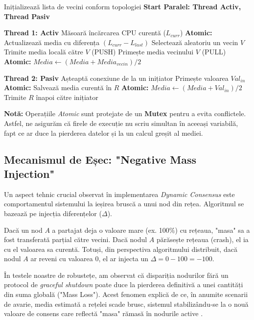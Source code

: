 \begin{algorithm}[H]
    \caption{Push-Pull Dynamic Average Consensus}
    \label{alg:push-pull}
    \begin{algorithmic}[1]
        \State Inițializează lista de vecini conform topologiei
        \State \textbf{Start Paralel: Thread Activ, Thread Pasiv}

        \State \textbf{Thread 1: Activ}
        \State \quad Măsoară încărcarea CPU curentă ($L_{curr}$)
        \State \quad \textbf{Atomic:} Actualizează media cu diferența $(L_{curr} - L_{last})$
        \State \quad Selectează aleatoriu un vecin $V$
        \State \quad Trimite media locală către $V$ (PUSH)
        \State \quad Primește media vecinului $V$ (PULL)
        \State \quad \textbf{Atomic:} $Media \leftarrow (Media + Media_{vecin}) / 2$

        \State \textbf{Thread 2: Pasiv}
        \State \quad Așteaptă conexiune de la un inițiator
        \State \quad Primește valoarea $Val_{in}$
        \State \quad \quad \textbf{Atomic:} Salvează media curentă în $R$
        \State \quad \quad \textbf{Atomic:} $Media \leftarrow (Media + Val_{in}) / 2$
        \State \quad Trimite $R$ înapoi către inițiator
    \end{algorithmic}
\end{algorithm}

\vspace{0.5em}
\noindent \textbf{Notă:} Operațiile \textit{Atomic} sunt protejate de un \textbf{Mutex} pentru a evita conflictele. Astfel, ne asigurăm că firele de execuție nu scriu simultan în aceeași variabilă, fapt ce ar duce la pierderea datelor și la un calcul greșit al mediei.

\subsection{Mecanismul de Eșec: "Negative Mass Injection"}
Un aspect tehnic crucial observat în implementarea \textit{Dynamic Consensus} este comportamentul sistemului la ieșirea bruscă a unui nod din rețea. Algoritmul se bazează pe injecția diferențelor ($\Delta$). 

Dacă un nod $A$ a partajat deja o valoare mare (ex. 100\%) cu rețeaua, "masa" sa a fost transferată parțial către vecini. Dacă nodul $A$ părăsește rețeaua (crash), el ia cu el valoarea sa curentă. Totuși, din perspectiva algoritmului distribuit, dacă nodul $A$ ar reveni cu valoarea 0, el ar injecta un $\Delta = 0 - 100 = -100$. 

În testele noastre de robustețe, am observat că dispariția nodurilor fără un protocol de \textit{graceful shutdown} poate duce la pierderea definitivă a unei cantități din suma globală ("Mass Loss"). Acest fenomen explică de ce, în anumite scenarii de avarie, media estimată a rețelei scade brusc, sistemul stabilizându-se la o nouă valoare de consens care reflectă "masa" rămasă în nodurile active \cite{kempe2003gossip}.